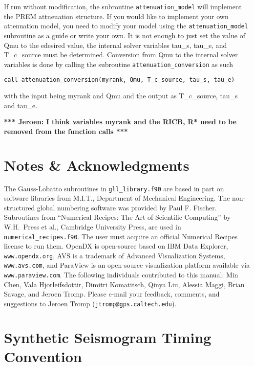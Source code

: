 \documentclass[onecolumn]{article}
\newcommand{\tojeroen}[1]{\textbf{*** Jeroen: #1 ***}}
\begin{document}
If run without modification, the subroutine \texttt{attenuation\_model} 
will implement the PREM attneuation
structure.  If you would like to implement your own attenuation model, 
you need to modify your model
using the \texttt{attenuation\_model} subroutine as a guide or write 
your own.  It is not enough to just set
the value of Qmu to the edesired value, the internal solver variables 
tau\_s, tau\_e, and T\_c\_source must be determined.
Conversion from Qmu to the internal solver variables is done by calling 
the subroutine \texttt{attenuation\_conversion}
as such
\begin{verbatim}
call attenuation_conversion(myrank, Qmu, T_c_source, tau_s, tau_e)
\end{verbatim}
with the input being myrank and Qmu and the output as T\_c\_source, tau\_s 
and tau\_e.

\tojeroen{I think variables myrank and the RICB, R* need to be removed 
from the function calls}

\section*{Notes \& Acknowledgments}

The Gauss-Lobatto subroutines in \texttt{gll\_library.f90} are based in part on
software libraries from M.I.T., Department of Mechanical Engineering.
The non-structured global numbering software was provided by Paul F. Fischer.
Subroutines from ``Numerical Recipes: The Art of Scientific Computing''
by W.H.\ Press et al., Cambridge University Press, are used in
\texttt{numerical\_recipes.f90}. The user must acquire an official
Numerical Recipes license to run them.
OpenDX is open-source based on IBM Data Explorer, \texttt{www.opendx.org},
AVS is a trademark of Advanced Visualization Systems, \texttt{www.avs.com},
and ParaView is an open-source visualization
platform available via \texttt{www.paraview.com}.
The following individuals contributed to this manual:
Min Chen, Vala Hjorleifsdottir, Dimitri Komatitsch, Qinya Liu,
Alessia Maggi, Brian Savage, and Jeroen Tromp.
Please e-mail your feedback, comments, and suggestions to
Jeroen Tromp (\texttt{jtromp@gps.caltech.edu}).





\appendix

\section{Synthetic Seismogram Timing Convention}
\end{document}

